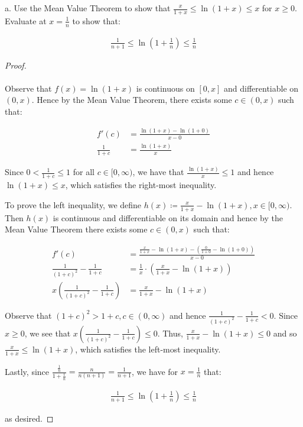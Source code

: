 a.  Use the Mean Value Theorem to show that
    $\frac{x}{1 + x} \le \ln{\left(1 + x\right)} \le x$ for $x \ge 0$. Evaluate at
    $x = \frac{1}{n}$ to show that:

    \begin{align*}
        \frac{1}{n+1} \le \ln{\left(1 + \frac{1}{n}\right)} \le \frac{1}{n}
    \end{align*}

    \begin{proof}\ \\\\
        Observe that $f(x) = \ln{(1+x)}$ is continuous on $[0, x]$ and
        differentiable on $(0, x)$. Hence by the Mean Value Theorem, there
        exists some $c \in (0, x)$ such that:
    
        \begin{align*}
            f'(c) &= \frac{\ln(1+x) - \ln(1+0)}{x-0} \\
            \frac{1}{1+c} &= \frac{\ln(1+x)}{x}
        \end{align*}

        Since $0 < \frac{1}{1+c} \le 1$ for all $c \in [0, \infty)$, we have
        that $\frac{\ln{(1+x)}}{x} \le 1$ and hence $\ln{(1+x)} \le x$, which
        satisfies the right-most inequality.

        To prove the left inequality, we define
        $h(x) \coloneqq \frac{x}{1+x} - \ln{(1+x)}, x \in [0, \infty)$. Then
        $h(x)$ is continuous and differentiable on its domain and hence by the
        Mean Value Theorem there exists some $c \in (0, x)$ such that:

        \begin{align*}
            f'(c) &= \frac{\frac{x}{1+x} - \ln(1+x) - \left(\frac{0}{1+0} - \ln(1+0)\right)}{x-0} \\
            \frac{1}{(1+c)^2} - \frac{1}{1+c} &= \frac{1}{x} \cdot \left(\frac{x}{1+x} - \ln(1+x)\right) \\
            x\left(\frac{1}{(1+c)^2} - \frac{1}{1+c}\right) &= \frac{x}{1+x} - \ln(1+x)
        \end{align*}

        Observe that $(1+c)^2 > 1+c, c \in (0, \infty)$ and hence 
        $\frac{1}{(1+c)^2} - \frac{1}{1+c} < 0$. Since $x \ge 0$, we see that
        $x\left(\frac{1}{(1+c)^2} - \frac{1}{1+c}\right) \le 0$. Thus,
        $\frac{x}{1+x} - \ln(1+x) \le 0$ and so $\frac{x}{1+x} \le \ln(1+x)$,
        which satisfies the left-most inequality.

        Lastly, since $\frac{\frac{1}{n}}{1 + \frac{1}{n}} = \frac{n}{n(n+1)} = \frac{1}{n+1}$,
        we have for $x = \frac{1}{n}$ that:

        \begin{align*}
            \frac{1}{n+1} \le \ln{\left(1 + \frac{1}{n}\right)} \le \frac{1}{n}
        \end{align*}

        as desired.
    \end{proof}
    \pagebreak

